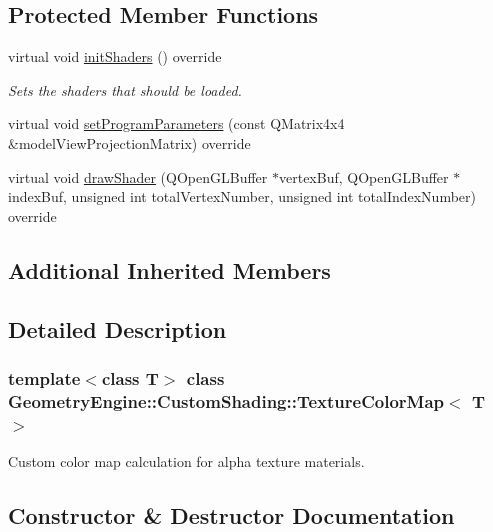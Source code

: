 \subsection*{Protected Member Functions}
\begin{DoxyCompactItemize}
\item 
\mbox{\label{class_geometry_engine_1_1_custom_shading_1_1_texture_color_map_a83da12b8fc11a8a6faba718e57505c7a}} 
virtual void \mbox{\hyperlink{class_geometry_engine_1_1_custom_shading_1_1_texture_color_map_a83da12b8fc11a8a6faba718e57505c7a}{init\+Shaders}} () override
\begin{DoxyCompactList}\small\item\em Sets the shaders that should be loaded. \end{DoxyCompactList}\item 
virtual void \mbox{\hyperlink{class_geometry_engine_1_1_custom_shading_1_1_texture_color_map_ab24f03e6d8dabac3889315c5e583a60d}{set\+Program\+Parameters}} (const Q\+Matrix4x4 \&model\+View\+Projection\+Matrix) override
\item 
virtual void \mbox{\hyperlink{class_geometry_engine_1_1_custom_shading_1_1_texture_color_map_a99a77c4dc1deb9e149121a65f5a1a1af}{draw\+Shader}} (Q\+Open\+G\+L\+Buffer $\ast$vertex\+Buf, Q\+Open\+G\+L\+Buffer $\ast$index\+Buf, unsigned int total\+Vertex\+Number, unsigned int total\+Index\+Number) override
\end{DoxyCompactItemize}
\subsection*{Additional Inherited Members}


\subsection{Detailed Description}
\subsubsection*{template$<$class T$>$\newline
class Geometry\+Engine\+::\+Custom\+Shading\+::\+Texture\+Color\+Map$<$ T $>$}

Custom color map calculation for alpha texture materials. 

\subsection{Constructor \& Destructor Documentation}
\mbox{\label{class_geometry_engine_1_1_custom_shading_1_1_texture_color_map_a000a319c9a3f470c14ecaa533ae6b27c}} 
